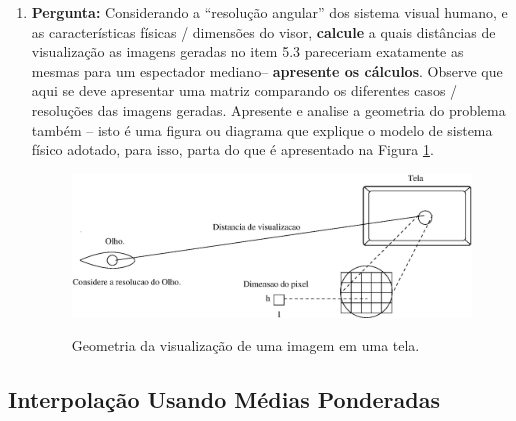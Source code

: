 \documentclass[11pt]{article}
\begin{document}
\begin{enumerate}

\item \textbf{Pergunta:} Considerando a ``resolução angular'' dos sistema visual humano, e as características físicas / dimensões do visor, \textbf{calcule} a quais distâncias de visualização as imagens geradas no item 5.3 pareceriam exatamente as mesmas para um espectador mediano-- \textbf{apresente os cálculos}. Observe que aqui se deve apresentar uma matriz comparando os diferentes casos / resoluções das imagens geradas. Apresente e analise a geometria do problema também -- isto é uma figura ou diagrama que explique o modelo de sistema físico adotado, para isso, parta do que é apresentado na Figura \ref{fig:dist_visual}.

\begin{figure}[h!]
\begin{center}
{\includegraphics[width=12cm]{./dist_vis.eps}}
\caption{Geometria da visualização de uma imagem em uma tela.}\label{fig:dist_visual}
\end{center}
\end{figure}

\end{enumerate}





\subsection{Interpolação Usando Médias Ponderadas}
\end{document}
